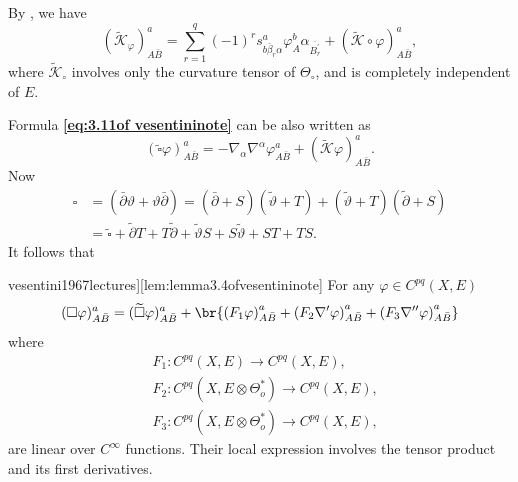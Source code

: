 \documentclass[lang=en,12pt]{beautybook}
\begin{document}
By \cite[Remark (3) after Lemma 3.2]{vesentini1967lectures}, we have
\begin{equation}\label{eq:3.13of vesentininote}
  \left(\widetilde{\mathcal{K}}_{\varphi}\right)_{A \bar{B}}^a=\sum_{r=1}^q(-1)^r s_{b \bar{\beta}_r \alpha}^a \varphi_A^b \alpha_{\overline{B_r^{\prime}}}+\left(\widetilde{\mathcal{K}} \circ \varphi\right)_{A \bar{B}}^a,
\end{equation}
where $\tilde{\mathcal{K}}_{\circ}$ involves only the curvature tensor of $\Theta_{\circ}$, and is completely independent of $E$.

Formula \textbf{\eqref{eq:3.11of vesentininote}} can be also written as
\begin{equation}\label{eq:3.14of vesentininote}
  (\widetilde{\square} \varphi)_{A \bar{B}}^a=-\nabla_\alpha \nabla^\alpha \varphi_{A \bar{B}}^a+(\widetilde{\mathcal{K}} \varphi)_{A \bar{B}}^a .
\end{equation}
Now
\begin{equation*}
  \begin{aligned}
    \square & =(\bar{\partial} \vartheta+\vartheta \bar{\partial})=(\bar{\partial}+S)(\tilde{\vartheta}+T)+(\tilde{\vartheta}+T)(\tilde{\partial}+S) \\
            & =\tilde{\square}+\tilde{\partial} T+T \tilde{\partial}+\tilde{\vartheta} S+S \tilde{\vartheta}+S T+T S .
  \end{aligned}
\end{equation*}
It follows that
\begin{lemma}[][\cite[Lemma 3.4.]{vesentini1967lectures}][lem:lemma3.4ofvesentininote]
  For any $\varphi \in C^{p q}(X, E)$
  \begin{equation}\label{eq:local-expression-of-Beltrami-operator}
    (\square \varphi)_{A \bar{B}}^a=(\widetilde{\square} \varphi)_{A \bar{B}}^a+\br{\left(F_1 \varphi\right)_{A \bar{B}}^a+\left(F_2 \nabla^{\prime} \varphi\right)_{A \bar{B}}^a+\left(F_3 \nabla^{\prime \prime} \varphi\right)_{A \bar{B}}^a}
  \end{equation}
  where
  \begin{equation*}
    \begin{aligned}
       & F_1: C^{p q}(X, E) \rightarrow C^{p q}(X, E),                               \\
       & F_2: C^{p q}\left(X, E \otimes \Theta_o^*\right) \rightarrow C^{p q}(X, E), \\
       & F_3: C^{p q}\left(X, E \otimes \Theta_o^*\right) \rightarrow C^{p q}(X, E),
    \end{aligned}
  \end{equation*}
  are linear over $C^{\infty}$ functions. Their local expression involves the tensor product and its first derivatives.
\end{lemma}
\end{document}
